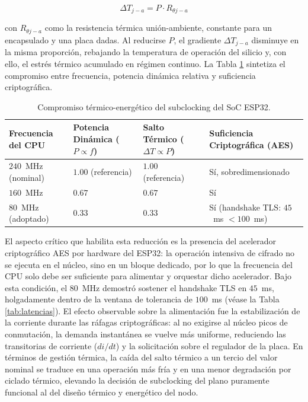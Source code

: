 \begin{equation}
\Delta T_{j-a} = P \cdot R_{\theta j-a}
\label{eq:salto_termico}
\end{equation}

\par con $R_{\theta j-a}$ como la resistencia térmica unión-ambiente, constante para un encapsulado y una placa dadas. Al reducirse $P$, el gradiente $\Delta T_{j-a}$ disminuye en la misma proporción, rebajando la temperatura de operación del silicio y, con ello, el estrés térmico acumulado en régimen continuo. La Tabla \ref{tab:underclocking} sintetiza el compromiso entre frecuencia, potencia dinámica relativa y suficiencia criptográfica.\\

\begin{table}[htbp]
\centering
\caption{Compromiso térmico-energético del subclocking del SoC ESP32.}
\label{tab:underclocking}
\begin{tabularx}{\textwidth}{@{}>{\raggedright\arraybackslash}p{3.0cm} >{\raggedright\arraybackslash}X >{\raggedright\arraybackslash}X >{\raggedright\arraybackslash}X@{}}
\toprule
\textbf{Frecuencia del CPU} & \textbf{Potencia Dinámica ($P \propto f$)} & \textbf{Salto Térmico ($\Delta T \propto P$)} & \textbf{Suficiencia Criptográfica (AES)} \\
\midrule
$240$~MHz (nominal) & $1.00$ (referencia) & $1.00$ (referencia) & Sí, sobredimensionado \\
$160$~MHz & $0.67$ & $0.67$ & Sí \\
$80$~MHz (adoptado) & $0.33$ & $0.33$ & Sí (handshake TLS: $45$~ms $< 100$~ms) \\
\bottomrule
\end{tabularx}
\end{table}

\par El aspecto crítico que habilita esta reducción es la presencia del acelerador criptográfico AES por hardware del ESP32: la operación intensiva de cifrado no se ejecuta en el núcleo, sino en un bloque dedicado, por lo que la frecuencia del CPU solo debe ser suficiente para alimentar y orquestar dicho acelerador. Bajo esta condición, el $80$~MHz demostró sostener el handshake TLS en $45$~ms, holgadamente dentro de la ventana de tolerancia de $100$~ms (véase la Tabla \ref{tab:latencias}). El efecto observable sobre la alimentación fue la estabilización de la corriente durante las ráfagas criptográficas: al no exigirse al núcleo picos de conmutación, la demanda instantánea se vuelve más uniforme, reduciendo las transitorias de corriente ($di/dt$) y la solicitación sobre el regulador de la placa. En términos de gestión térmica, la caída del salto térmico a un tercio del valor nominal se traduce en una operación más fría y en una menor degradación por ciclado térmico, elevando la decisión de subclocking del plano puramente funcional al del diseño térmico y energético del nodo.

